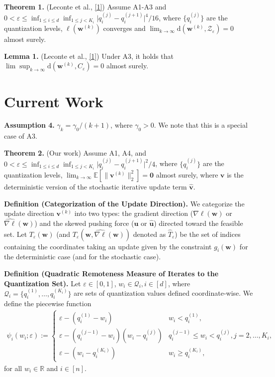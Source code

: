 \documentclass[10pt,a4paper]{article}
\begin{document}
\textbf{Theorem 1.} (Leconte et al., \ref{1}) Assume A1-A3 and $0<\varepsilon\leq \inf_{1\leq i\leq d}\inf_{1\leq j< K_i} \lvert q^{(j)}_i - q^{(j+1)}_i\rvert^4/16$, where $\{q^{(j)}_i\}$ are the quantization levels, $\ell(\mathbf{w}^{(k)})$ converges and $\lim_{k\to\infty} \text{d}(\mathbf{w}^{(k)}, \mathcal{Z}_\varepsilon)=0$ almost surely.

\textbf{Lemma 1.} (Leconte et al., \ref{1}) Under A3, it holds that $\lim\sup_{k\to\infty} \text{d}(\mathbf{w}^{(k)}, C_\varepsilon)=0$ almost surely.

\section{Current Work} 

\textbf{Assumption 4.} $\gamma_k=\gamma_0/(k+1)$, where $\gamma_0>0$. We note that this is a special case of A3.

\textbf{Theorem 2.} (Our work) Assume A1, A4, and $0<\varepsilon\leq \inf_{1\leq i\leq d}\inf_{1\leq j< K_i} \lvert q^{(j)}_i - q^{(j+1)}_i\rvert^2/4$, where $\{q^{(j)}_i\}$ are the quantization levels, $\lim_{k\to\infty} \mathbb{E}[\lVert \mathbf{v}^{(k)}\rVert_2^2]=\mathbf{0}$ almost surely, where $\mathbf{v}$ is the deterministic version of the stochastic iterative update term $\widehat{\mathbf{v}}$.

\textbf{Definition (Categorization of the Update Direction).} We categorize the update direction $\mathbf{v}^{(k)}$ into two types: the gradient direction ($\nabla\ell(\mathbf{w})$ or $\widehat{\nabla\ell}(\mathbf{w})$) and the skewed pushing force ($\mathbf{u}$ or $\widehat{\mathbf{u}}$) directed toward the feasible set.
Let $T_\varepsilon(\mathbf{w})$ (and $T_\varepsilon(\mathbf{w}, \widehat{\nabla\ell}(\mathbf{w}))$ denoted as $\hat{T}_\varepsilon$) be the set of indices containing the coordinates taking an update given by the constraint $g_i(\textbf{w})$ for the deterministic case (and for the stochastic case).

\textbf{Definition (Quadratic Remoteness Measure of Iterates to the Quantization Set).} Let $\varepsilon\in[0,1]$, $w_i\in \mathcal{Q}_i, i\in [d]$,
where $\mathcal{Q}_i=\{q^{(1)}_i, \ldots, q^{(K_i)}_i\}$ are sets of quantization values defined coordinate-wise. We define the piecewise function
\begin{align*}\psi_{i}(w_i;\varepsilon):=\begin{cases}\varepsilon-(q_i^{(1)}-w_i)                  & w_i < q_i^{(1)},                                  \\
             \varepsilon-(q_i^{(j-1)}-w_i)(w_i-q_i^{(j)}) & q_i^{(j-1)}\leq w_i < q_i^{(j)}, j=2,\ldots, K_i, \\
             \varepsilon-(w_i-q_i^{(K_i)})                & w_i \geq q_i^{(K_i)},\end{cases}
\end{align*} for all $w_i\in\mathbb{R}$ and $i\in [n]$.
\end{document}
